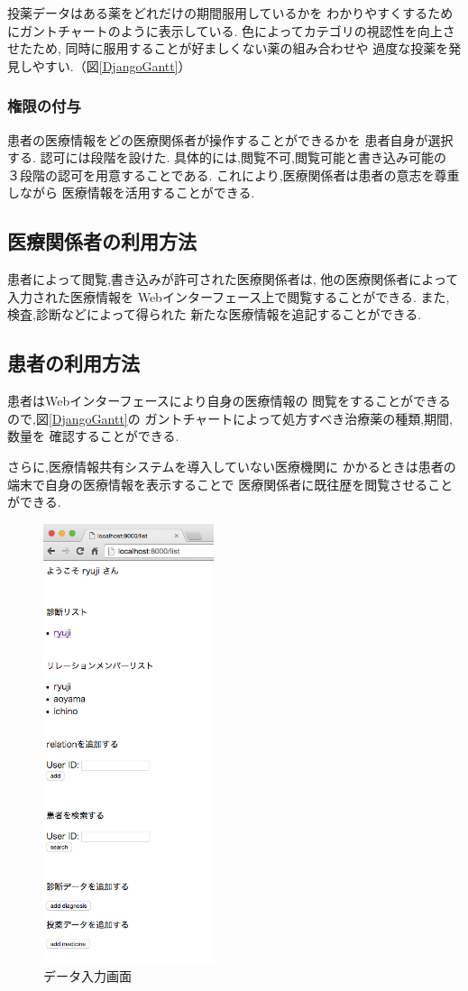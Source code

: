     投薬データはある薬をどれだけの期間服用しているかを
    わかりやすくするためにガントチャートのように表示している.
    色によってカテゴリの視認性を向上させたため,
    同時に服用することが好ましくない薬の組み合わせや
    過度な投薬を発見しやすい.（図\ref{DjangoGantt}）

  \subsubsection{権限の付与}
    患者の医療情報をどの医療関係者が操作することができるかを
    患者自身が選択する.
    認可には段階を設けた.
    具体的には,閲覧不可,閲覧可能と書き込み可能の
    ３段階の認可を用意することである.
    これにより,医療関係者は患者の意志を尊重しながら
    医療情報を活用することができる.

\subsection{医療関係者の利用方法}
  患者によって閲覧,書き込みが許可された医療関係者は,
  他の医療関係者によって入力された医療情報を
  Webインターフェース上で閲覧することができる.
  また,検査,診断などによって得られた
  新たな医療情報を追記することができる.

\subsection{患者の利用方法}
  患者はWebインターフェースにより自身の医療情報の
  閲覧をすることができるので,図\ref{DjangoGantt}の
  ガントチャートによって処方すべき治療薬の種類,期間,数量を
  確認することができる.

  さらに,医療情報共有システムを導入していない医療機関に
  かかるときは患者の端末で自身の医療情報を表示することで
  医療関係者に既往歴を閲覧させることができる.


    \begin{figure}[htbp]
        \includegraphics[width=5cm, bb=0 0 437 688]{./gazou/DjangoFileio2.png}
      \caption{データ入力画面}
      \label{DjangoFileio}
    \end{figure}

